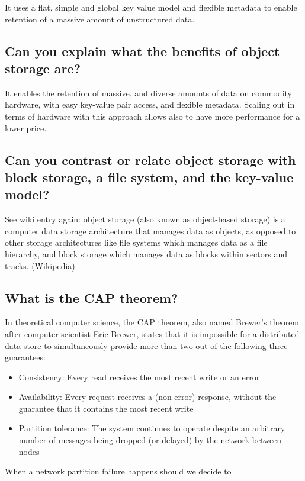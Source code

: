 \documentclass{article}
\begin{document}
It uses a flat, simple and global key value model and flexible metadata to enable retention of a massive amount of unstructured data.

\subsection{Can you explain what the benefits of object storage are?}

It enables the retention of massive, and diverse amounts of data on commodity hardware, with easy key-value pair access, and flexible metadata. Scaling out in terms of hardware with this approach allows also to have more performance for a lower price.

\subsection{Can you contrast or relate object storage with block storage, a file system, and the key-value model?}

See wiki entry again: object storage (also known as object-based storage) is a computer data storage architecture that manages data as objects, as opposed to other storage architectures like file systems which manages data as a file hierarchy, and block storage which manages data as blocks within sectors and tracks. (Wikipedia)

\subsection{What is the CAP theorem?}

In theoretical computer science, the CAP theorem, also named Brewer's theorem after computer scientist Eric Brewer, states that it is impossible for a distributed data store to simultaneously provide more than two out of the following three guarantees:

\begin{itemize}
\item Consistency: Every read receives the most recent write or an error
\item Availability: Every request receives a (non-error) response, without the guarantee that it contains the most recent write
\item Partition tolerance: The system continues to operate despite an arbitrary number of messages being dropped (or delayed) by the network between nodes
\end{itemize}

When a network partition failure happens should we decide to
\end{document}
